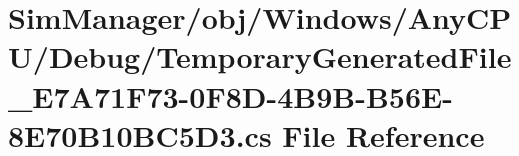 \hypertarget{_sim_manager_2obj_2_windows_2_any_c_p_u_2_debug_2_temporary_generated_file___e7_a71_f73-0_f8_d-449dd7504bfafc3f4e0cb1466a76f8752}{}\section{Sim\+Manager/obj/\+Windows/\+Any\+C\+P\+U/\+Debug/\+Temporary\+Generated\+File\+\_\+\+E7\+A71\+F73-\/0\+F8\+D-\/4\+B9\+B-\/\+B56\+E-\/8\+E70\+B10\+B\+C5\+D3.cs File Reference}
\label{_sim_manager_2obj_2_windows_2_any_c_p_u_2_debug_2_temporary_generated_file___e7_a71_f73-0_f8_d-449dd7504bfafc3f4e0cb1466a76f8752}

